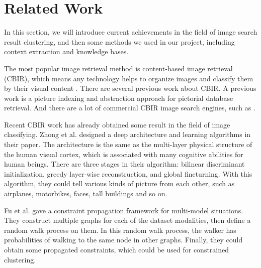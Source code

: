 \section{Related Work}
\label{related}

In this section, we will introduce current achievements in the field of
image search result clustering, and then some methods we used in our project,
including context extraction and knowledge bases.


The most popular image retrieval method is content-based image
retrieval (CBIR), which means any technology helps to organize images and
classify them by their visual content \cite{Datta2008}. There are several
previous work about CBIR. A previous work \cite{Chang1984} is a picture indexing
and abstraction approach for pictorial database retrieval. And there are a lot
of commercial CBIR image search engines, such as \cite{Smith1996}.

Recent CBIR work has already obtained some result in the field of image
classifying. Zhong et al. \cite{ZhongLL11} designed a deep architecture and
learning algorithms in their paper. The architecture is the same as the
multi-layer physical structure of the human visual cortex, which is associated
with many cognitive abilities for human beings. There are three stages in their
algorithm: bilinear discriminant initialization, greedy layer-wise
reconstruction, and global fineturning. With this algorithm, they could tell
various kinds of picture from each other, such as airplanes, motorbikes, faces,
tall buildings and so on.

Fu et al. \cite{Fu2011} gave a constraint propagation framework for multi-model
situations. They construct multiple graphs for each of the dataset modalities,
then define a random walk process on them. In this random walk process, the
walker has probabilities of walking to the same node in other graphs. Finally,
they could obtain some propagated constraints, which could be used for
constrained clustering.


